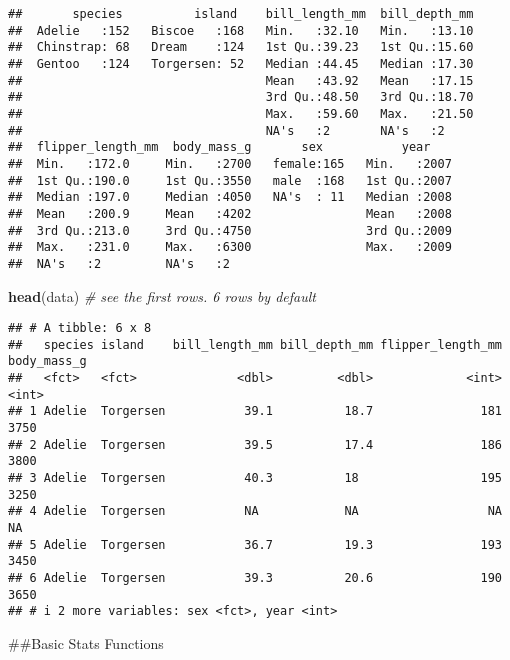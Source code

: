\documentclass[
]{article}
\newenvironment{Shaded}{\begin{snugshade}}{\end{snugshade}}
\newcommand{\AttributeTok}[1]{\textcolor[rgb]{0.13,0.29,0.53}{#1}}
\newcommand{\CommentTok}[1]{\textcolor[rgb]{0.56,0.35,0.01}{\textit{#1}}}
\newcommand{\ConstantTok}[1]{\textcolor[rgb]{0.56,0.35,0.01}{#1}}
\newcommand{\FunctionTok}[1]{\textcolor[rgb]{0.13,0.29,0.53}{\textbf{#1}}}
\newcommand{\NormalTok}[1]{#1}
\newcommand{\SpecialCharTok}[1]{\textcolor[rgb]{0.81,0.36,0.00}{\textbf{#1}}}
\begin{document}
\begin{verbatim}
##       species          island    bill_length_mm  bill_depth_mm  
##  Adelie   :152   Biscoe   :168   Min.   :32.10   Min.   :13.10  
##  Chinstrap: 68   Dream    :124   1st Qu.:39.23   1st Qu.:15.60  
##  Gentoo   :124   Torgersen: 52   Median :44.45   Median :17.30  
##                                  Mean   :43.92   Mean   :17.15  
##                                  3rd Qu.:48.50   3rd Qu.:18.70  
##                                  Max.   :59.60   Max.   :21.50  
##                                  NA's   :2       NA's   :2      
##  flipper_length_mm  body_mass_g       sex           year     
##  Min.   :172.0     Min.   :2700   female:165   Min.   :2007  
##  1st Qu.:190.0     1st Qu.:3550   male  :168   1st Qu.:2007  
##  Median :197.0     Median :4050   NA's  : 11   Median :2008  
##  Mean   :200.9     Mean   :4202                Mean   :2008  
##  3rd Qu.:213.0     3rd Qu.:4750                3rd Qu.:2009  
##  Max.   :231.0     Max.   :6300                Max.   :2009  
##  NA's   :2         NA's   :2
\end{verbatim}

\begin{Shaded}
\begin{Highlighting}[]
\FunctionTok{head}\NormalTok{(data) }\CommentTok{\# see the first rows. 6 rows by default}
\end{Highlighting}
\end{Shaded}

\begin{verbatim}
## # A tibble: 6 x 8
##   species island    bill_length_mm bill_depth_mm flipper_length_mm body_mass_g
##   <fct>   <fct>              <dbl>         <dbl>             <int>       <int>
## 1 Adelie  Torgersen           39.1          18.7               181        3750
## 2 Adelie  Torgersen           39.5          17.4               186        3800
## 3 Adelie  Torgersen           40.3          18                 195        3250
## 4 Adelie  Torgersen           NA            NA                  NA          NA
## 5 Adelie  Torgersen           36.7          19.3               193        3450
## 6 Adelie  Torgersen           39.3          20.6               190        3650
## # i 2 more variables: sex <fct>, year <int>
\end{verbatim}

\#\#Basic Stats Functions

\begin{Shaded}
\end{Shaded}
\end{document}
